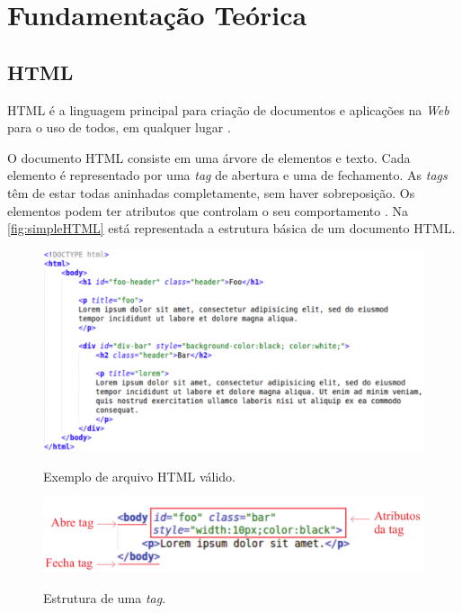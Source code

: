 %
%

\chapter{Fundamentação Teórica}
\label{chap:fund-teor}
\section{HTML}
\label{sec:html}
HTML é a linguagem principal para criação de documentos e aplicações na \textit{Web} para o uso de todos, em qualquer lugar \cite{W3Chtml2015}.

O documento HTML consiste em uma árvore de elementos e texto. Cada elemento é representado por uma \textit{tag} de abertura e uma de fechamento. As \textit{tags} têm de estar todas aninhadas completamente, sem haver sobreposição. Os elementos podem ter atributos que controlam o seu comportamento \cite{HTMLspec2014}. Na \autoref{fig:simpleHTML} está representada a estrutura básica de um documento HTML.

\begin{figure}[!htb]
	\centering
	\caption{Exemplo de arquivo HTML válido.}
	\includegraphics[width=1\textwidth]{./04-figuras/html_simples}
	\label{fig:simpleHTML}
\end{figure}

\begin{figure}[!htb]
	\centering
	\caption{Estrutura de uma \textit{tag}.}
	\includegraphics[width=.5\textwidth]{./04-figuras/tag_element_attr_marked}
	\label{fig:tagStruct}
\end{figure}

